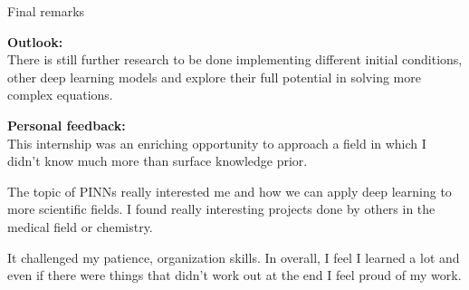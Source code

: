 \begin{frame}{Final remarks}

    \textbf{Outlook:}\\
    There is still further research to be done implementing different initial conditions, other deep learning models and explore their full 
    potential in solving more complex equations. 
    \vspace{0.3cm}

    \textbf{Personal feedback:}\\
    This internship was an enriching opportunity to approach a field in which I didn't know much more than surface knowledge prior.
    
    The topic of PINNs really interested me and how we can apply deep learning to more scientific fields. I found really interesting projects done by others 
    in the medical field or chemistry. 

    It challenged my patience, organization skills. In overall, I feel I learned a lot and even if there were things that didn't work out at the end
    I feel proud of my work. 
  

\end{frame}